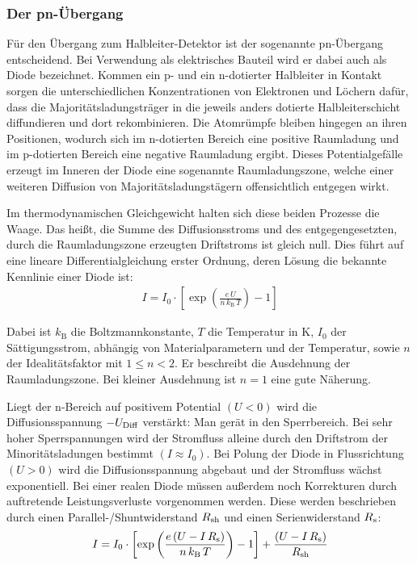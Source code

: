 \subsubsection{Der pn-Übergang}

Für den Übergang zum Halbleiter-Detektor ist der sogenannte pn-Übergang entscheidend.
Bei Verwendung als elektrisches Bauteil wird er dabei auch als Diode bezeichnet.
Kommen ein p- und ein n-dotierter Halbleiter in Kontakt sorgen die unterschiedlichen Konzentrationen von Elektronen und Löchern dafür, dass die Majoritätsladungsträger in die jeweils anders dotierte Halbleiterschicht diffundieren und dort rekombinieren.
Die Atomrümpfe bleiben hingegen an ihren Positionen, wodurch sich im n-dotierten Bereich eine positive Raumladung und im p-dotierten Bereich eine negative Raumladung ergibt.
Dieses Potentialgefälle erzeugt im Inneren der Diode eine sogenannte Raumladungszone, welche einer weiteren Diffusion von Majoritätsladungstägern offensichtlich entgegen wirkt.

Im thermodynamischen Gleichgewicht halten sich diese beiden Prozesse die Waage.
Das heißt, die Summe des Diffusionsstroms und des entgegengesetzten, durch die Raumladungszone erzeugten Driftstroms ist gleich null.
Dies führt auf eine lineare Differentialgleichung erster Ordnung, deren Lösung die bekannte Kennlinie einer Diode ist:
\begin{align}
I=I_0\cdot\left[ \exp\left( \frac{e\,U}{n\,k_\text{B}\,T}\right)  -1\right] 
\end{align} 

\noindent Dabei ist $k_\text{B}$  die Boltzmannkonstante,
$T$ die Temperatur in K, 
$I_0$ der Sättigungsstrom, abhängig von Materialparametern und der Temperatur, sowie
$n$ der Idealitätsfaktor mit $ 1 \leq n < 2$.
Er beschreibt die Ausdehnung der Raumladungszone.
Bei kleiner Ausdehnung ist $n = 1$ eine gute Näherung.

Liegt der n-Bereich auf positivem Potential $(U<0)$ wird die Diffusionsspannung $-U_\textnormal{Diff}$ verstärkt: Man gerät in den Sperrbereich.
Bei sehr hoher Sperrspannungen wird der Stromfluss alleine durch den Driftstrom der Minoritätsladungen bestimmt $(I\approx I_0)$.
Bei Polung der Diode in Flussrichtung $(U > 0)$ wird die Diffusionsspannung abgebaut und der Stromfluss wächst exponentiell.
Bei einer realen Diode müssen außerdem noch Korrekturen durch auftretende Leistungsverluste vorgenommen werden.
Diese werden beschrieben durch einen Parallel-/Shuntwiderstand $R_{\textnormal{sh}}$ und einen Serienwiderstand $R_{\textnormal{s}}$:
\begin{align}
I=I_0\cdot\left[ \exp\left( \frac{e\,(U-I\,R_\textnormal{s})}{n\,k_\textnormal{B}\,T}\right)  -1\right] +\frac{(U-I\,R_\textnormal{s})}{R_\textnormal{sh}}
\end{align} 



